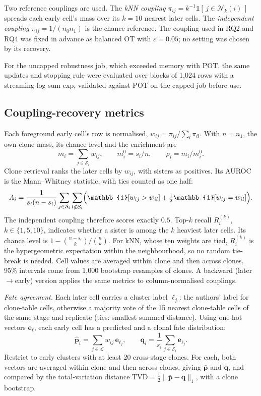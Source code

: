 \documentclass[10pt,journal,compsoc]{IEEEtran}
\begin{document}
Two reference couplings are used. The \emph{kNN coupling}
$\pi_{ij}=k^{-1}\mathbb{1}[\,j\in\mathcal{N}_k(i)\,]$ spreads each early cell's mass over its
$k=10$ nearest later cells. The \emph{independent coupling} $\pi_{ij}=1/(n_0n_1)$ is the
chance reference. The coupling used in RQ2 and RQ4 was fixed in advance as balanced OT with
$\varepsilon=0.05$; no setting was chosen by its recovery.

For the uncapped robustness job, which exceeded memory with POT, the same updates and
stopping rule were evaluated over blocks of 1{,}024 rows with a streaming log-sum-exp,
validated against POT on the capped job before use.

\subsection{Coupling-recovery metrics }\label{sec:metrics}
Each foreground early cell's row is normalised, $w_{ij}=\pi_{ij}/\sum_{l}\pi_{il}$. With
$n=n_1$, the own-clone mass, its chance level and the enrichment are
\begin{equation}
m_i=\sum_{j\in\mathcal{S}_i}w_{ij},\qquad m_i^{0}=s_i/n,\qquad \rho_i=m_i/m_i^{0}.
\end{equation}
Clone retrieval ranks the later cells by $w_{ij}$, with sisters as positives. Its AUROC is
the Mann--Whitney statistic, with ties counted as one half:
\begin{equation}
A_i=\frac{1}{s_i(n-s_i)}\sum_{j\in\mathcal{S}_i}\sum_{l\notin\mathcal{S}_i}
\Bigl(\mathbb{1}[w_{ij}>w_{il}]+\tfrac{1}{2}\mathbb{1}[w_{ij}=w_{il}]\Bigr).
\end{equation}
The independent coupling therefore scores exactly $0.5$. Top-$k$ recall $R_i^{(k)}$,
$k\in\{1,5,10\}$, indicates whether a sister is among the $k$ heaviest later cells. Its
chance level is $1-\binom{n-s_i}{k}/\binom{n}{k}$. For kNN, whose ten weights are tied,
$R_i^{(k)}$ is the hypergeometric expectation within the neighbourhood, so no random
tie-break is needed. Cell values are averaged within clone and then across clones.
95\% intervals come from 1{,}000 bootstrap resamples of clones. A backward (later$\to$early)
version applies the same metrics to column-normalised couplings.

\emph{Fate agreement.} Each later cell carries a cluster label $\ell_j$: the authors' label
for clone-table cells, otherwise a majority vote of the 15 nearest clone-table cells of the
same stage and replicate (ties: smallest summed distance). Using one-hot vectors $\mathbf{e}_\ell$, each early cell has a
predicted and a clonal fate distribution:
\begin{equation}
\hat{\mathbf{p}}_i=\sum_{j\in\mathcal{L}}w_{ij}\,\mathbf{e}_{\ell_j},\qquad
\mathbf{q}_i=\frac{1}{s_i}\sum_{j\in\mathcal{S}_i}\mathbf{e}_{\ell_j}.
\end{equation}
Restrict to early clusters with at least 20 cross-stage clones. For each, both vectors are
averaged within clone and then across clones, giving $\bar{\mathbf{p}}$ and
$\bar{\mathbf{q}}$, and compared by the total-variation distance
$\mathrm{TVD}=\tfrac{1}{2}\|\bar{\mathbf{p}}-\bar{\mathbf{q}}\|_1$, with a clone bootstrap.
\end{document}
